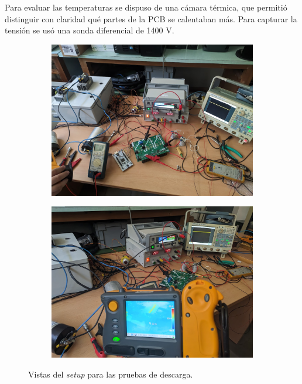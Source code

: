 Para evaluar las temperaturas se dispuso de una cámara térmica, que permitió distinguir con claridad qué partes de la PCB se calentaban más. Para capturar la tensión se usó una sonda diferencial de 1400 V.

\begin{figure}[H]
	\centering
	\begin{subfigure}[b]{0.45\textwidth}
		\centering
		\includegraphics[width=\textwidth]{fig/setupDischarge1}
	\end{subfigure}
	\hfill
	\begin{subfigure}[b]{0.45\textwidth}
		\centering
		\includegraphics[width=\textwidth]{fig/setupDischarge2}
	\end{subfigure}
	\caption{Vistas del \textit{setup} para las pruebas de descarga.}

\end{figure}


